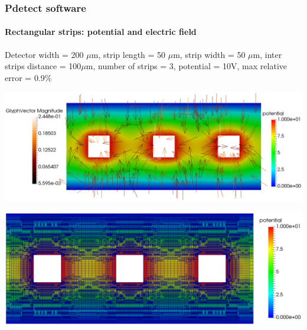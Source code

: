 \documentclass[14pt]{beamer}
\begin{document}
\begin{frame}
  \frametitle{Pdetect software}
  \framesubtitle{Rectangular strips: potential and electric field}

  \fontsize{10pt}{7.2}\selectfont


  Detector width = 200 $\mu$m, strip length = 50 $\mu$m, strip width = 50 $\mu$m,
	inter strips distance = 100$\mu$m, number of strips = 3, potential = 10V,
	max relative error = 0.9$\%$

  \begin{center}
  \includegraphics[scale=0.175]{images/rect_rect_pot_3.png}
  \end{center}

\vspace{-2em}

  \begin{center}
  \hspace{4em} \includegraphics[scale=0.15]{images/rect_rect_pot_3_grid.png}
  \end{center}

\end{frame}
\end{document}
